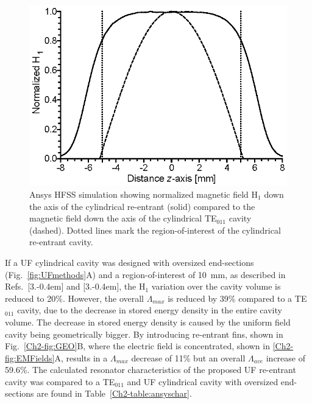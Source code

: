 \begin{figure}[htb]\centering
 \includegraphics{Kapitel/Ch2-Images/02-TE01UProfile.eps}
 \caption[Ansys HFSS simulation of normalized H$_1$ field.]{Ansys HFSS simulation showing normalized magnetic field H$_1$ down the axis of the cylindrical re-entrant \cylTE{} (solid) compared to the magnetic field down the axis of the cylindrical TE$_{\text{011}}$ cavity (dashed). Dotted lines mark the region-of-interest of the cylindrical re-entrant \cylTE{} cavity. }
 \label{Ch2-fig:normb1}
\end{figure}

If a UF cylindrical \cylTE{} cavity was designed with oversized end-sections (Fig.~\ref{fig:UFmethods}A) and a region-of-interest of 10~mm, as described in Refs.~[3.\kern-0.4em] and [3.\kern-0.4em], the H$_1$ variation over the cavity volume is reduced to 20\%. However, the overall $\Lambda_{max}$ is reduced by 39\% compared to a TE$_{011}$ cavity, due to the decrease in stored energy density in the entire cavity volume. The decrease in stored energy density is caused by the uniform field cavity being geometrically bigger. By introducing re-entrant fins, shown in Fig.~\ref{Ch2-fig:GEO}B, where the electric field is concentrated, shown in \ref{Ch2-fig:EMFields}A, results in a $\Lambda_{max}$ decrease of 11\% but an overall $\Lambda_{ave}$ increase of 59.6\%. The calculated resonator characteristics of the proposed UF re-entrant \cylTE{} cavity was compared to a TE$_{011}$ and UF cylindrical \cylTE{} cavity with oversized end-sections are found in Table~\ref{Ch2-table:ansyschar}.

